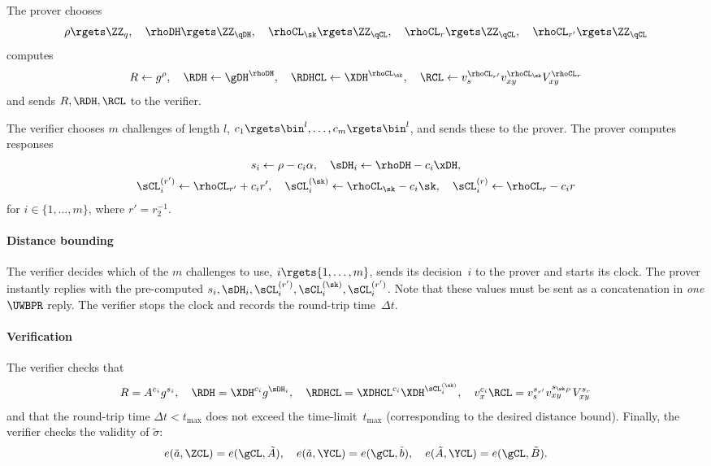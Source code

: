 The prover chooses \[
  \rho\rgets \ZZ_q, \quad
  \rhoDH\rgets \ZZ_{\qDH}, \quad
  \rhoCL_{\sk}\rgets \ZZ_{\qCL}, \quad
  \rhoCL_r\rgets \ZZ_{\qCL}, \quad
  \rhoCL_{r'}\rgets \ZZ_{\qCL}
\] computes \[
  R\gets g^\rho, \quad
  \RDH\gets \gDH^{\rhoDH}, \quad
  \RDHCL\gets \XDH^{\rhoCL_{\sk}}, \quad
  \RCL\gets v_s^{\rhoCL_{r'}} v_{xy}^{\rhoCL_{\sk}} V_{xy}^{\rhoCL_r}
\] and sends \(R, \RDH, \RCL\) to the verifier.

The verifier chooses \(m\) challenges of length \(l\), \(c_1\rgets \bin^l, 
\dotsc, c_m\rgets \bin^l\), and sends these to the prover.
The prover computes responses
\begin{multline*}
  s_i\gets \rho - c_i\alpha, \quad
  \sDH_i\gets \rhoDH - c_i \xDH, \\%
  \sCL_i^{(r')}\gets \rhoCL_{r'} + c_i r', \quad
  \sCL_i^{(\sk)}\gets \rhoCL_{\sk} - c_i \sk, \quad
  \sCL_i^{(r)}\gets \rhoCL_r - c_i r
\end{multline*}
for \(i\in \{1, \dotsc, m\}\), where \(r' = r_2^{-1}\).

\paragraph*{Distance bounding}

The verifier decides which of the \(m\) challenges to use, \(i\rgets \{1, 
\dotsc, m\}\), sends its decision~\(i\) to the prover and starts its clock.
The prover instantly replies with the pre-computed \(s_i, \sDH_i, 
\sCL_i^{(r')}, \sCL_i^{(\sk)}, \sCL_i^{(r')}\).
Note that these values must be sent as a concatenation in \emph{one} \(\UWBPR\) 
reply.
The verifier stops the clock and records the round-trip time~\(\Delta t\).

\paragraph*{Verification}

The verifier checks that \[
  R = A^{c_i} g^{s_i}, \quad
  \RDH = \XDH^{c_i} g^{\sDH_i}, \quad
  \RDHCL = \XDHCL^{c_i} \XDH^{\sCL_i^{(\sk)}}, \quad
  v_x^{c_i} \RCL = v_s^{s_{r'}} v_{xy}^{s_{\sk_P}} V_{xy}^{s_r}
\] and that the round-trip time \(\Delta t < t_{\max}\) does not exceed the 
time-limit~\(t_{\max}\) (corresponding to the desired distance bound).
Finally, the verifier checks the validity of \(\tilde \sigma\): \[
  e(\tilde a, \ZCL) = e(\gCL, \tilde A), \quad
  e(\tilde a, \YCL) = e(\gCL, \tilde b), \quad
  e(\tilde A, \YCL) = e(\gCL, \tilde B).
\]


